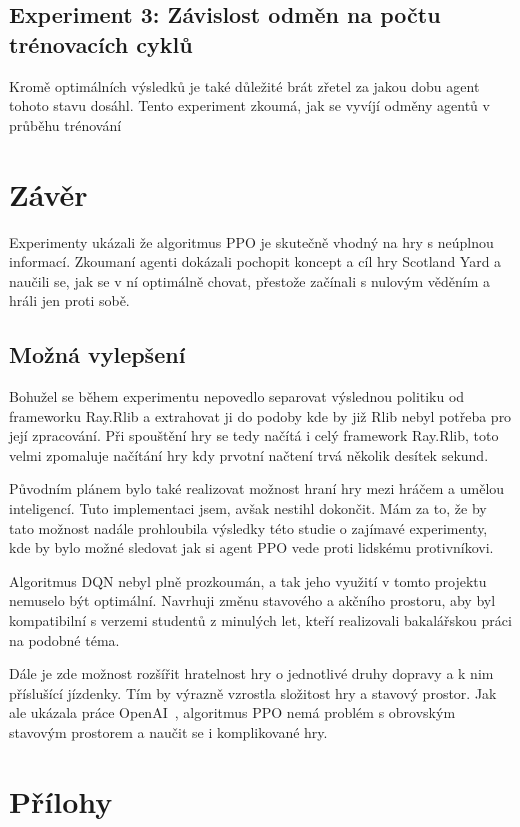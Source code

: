 \section{Experiment 3: Závislost odměn na počtu trénovacích cyklů}
\label{sec:experiment-3}

Kromě optimálních výsledků je také důležité brát zřetel za jakou dobu agent tohoto stavu dosáhl.
Tento experiment zkoumá, jak se vyvíjí odměny agentů v průběhu trénování


\chapter{Závěr}
\label{ch:zaver}

Experimenty ukázali že algoritmus PPO je skutečně vhodný na hry s neúplnou informací.
Zkoumaní agenti dokázali pochopit koncept a cíl hry Scotland Yard a naučili se, jak se v ní optimálně chovat, přestože začínali s nulovým věděním a hráli jen proti sobě.


\section*{Možná vylepšení}
\label{sec:mozna-vylepseni}

Bohužel se během experimentu nepovedlo separovat výslednou politiku od frameworku Ray.Rlib a extrahovat ji do podoby kde by již Rlib nebyl potřeba pro její zpracování.
Při spouštění hry se tedy načítá i celý framework Ray.Rlib, toto velmi zpomaluje načítání hry kdy prvotní načtení trvá několik desítek sekund.

Původním plánem bylo také realizovat možnost hraní hry mezi hráčem a umělou inteligencí.
Tuto implementaci jsem, avšak nestihl dokončit.
Mám za to, že by tato možnost nadále prohloubila výsledky této studie o zajímavé experimenty, kde by bylo možné sledovat jak si agent PPO vede proti lidskému protivníkovi.

Algoritmus DQN nebyl plně prozkoumán, a tak jeho využití v tomto projektu nemuselo být optimální.
Navrhuji změnu stavového a akčního prostoru, aby byl kompatibilní s verzemi studentů z minulých let, kteří realizovali bakalářskou práci na podobné téma.

Dále je zde možnost rozšířit hratelnost hry o jednotlivé druhy dopravy a k nim příslušící jízdenky.
Tím by výrazně vzrostla složitost hry a stavový prostor.
Jak ale ukázala práce OpenAI~\cite{Dota2}, algoritmus PPO nemá problém s obrovským stavovým prostorem a naučit se i komplikované hry.

\chapter{Přílohy}
\label{ch:prilohy}




%
